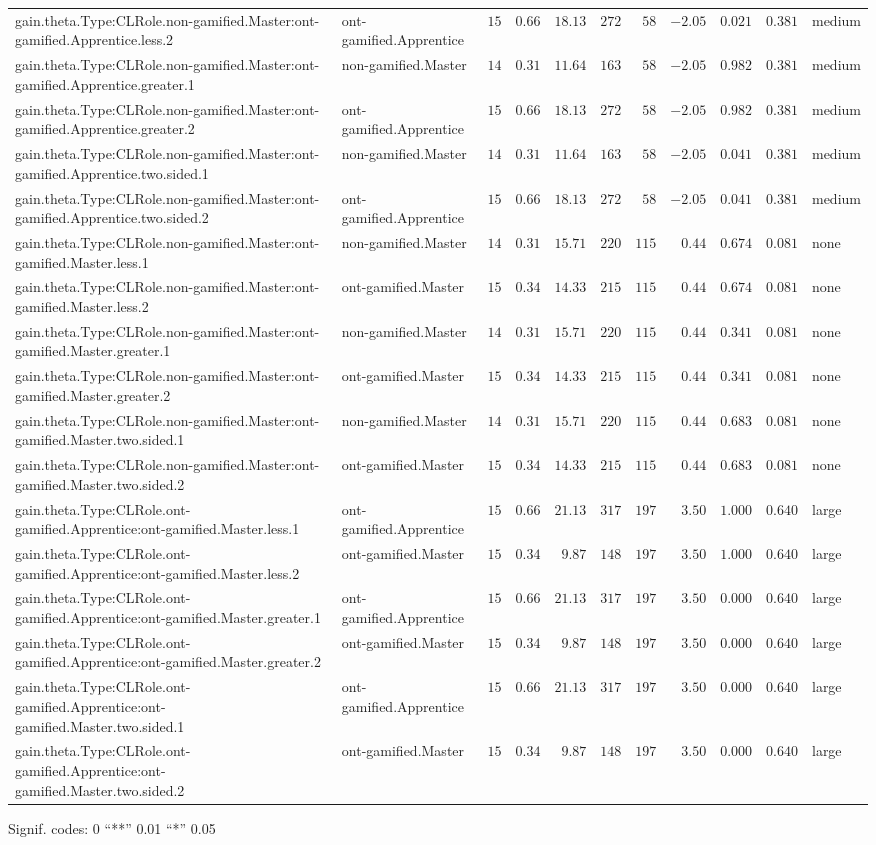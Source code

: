 \documentclass[6pt]{article}
\begin{document}
\begin{landscape}
{\begin{longtable}{llrrrrrrrrl}
gain.theta.Type:CLRole.non-gamified.Master:ont-gamified.Apprentice.less.2&ont-gamified.Apprentice&$15$&$0.66$&$18.13$&$272$&$ 58$&$-2.05$&$0.021$&$0.381$&medium\tabularnewline
gain.theta.Type:CLRole.non-gamified.Master:ont-gamified.Apprentice.greater.1&non-gamified.Master&$14$&$0.31$&$11.64$&$163$&$ 58$&$-2.05$&$0.982$&$0.381$&medium\tabularnewline
gain.theta.Type:CLRole.non-gamified.Master:ont-gamified.Apprentice.greater.2&ont-gamified.Apprentice&$15$&$0.66$&$18.13$&$272$&$ 58$&$-2.05$&$0.982$&$0.381$&medium\tabularnewline
gain.theta.Type:CLRole.non-gamified.Master:ont-gamified.Apprentice.two.sided.1&non-gamified.Master&$14$&$0.31$&$11.64$&$163$&$ 58$&$-2.05$&$0.041$&$0.381$&medium\tabularnewline
gain.theta.Type:CLRole.non-gamified.Master:ont-gamified.Apprentice.two.sided.2&ont-gamified.Apprentice&$15$&$0.66$&$18.13$&$272$&$ 58$&$-2.05$&$0.041$&$0.381$&medium\tabularnewline
gain.theta.Type:CLRole.non-gamified.Master:ont-gamified.Master.less.1&non-gamified.Master&$14$&$0.31$&$15.71$&$220$&$115$&$ 0.44$&$0.674$&$0.081$&none\tabularnewline
gain.theta.Type:CLRole.non-gamified.Master:ont-gamified.Master.less.2&ont-gamified.Master&$15$&$0.34$&$14.33$&$215$&$115$&$ 0.44$&$0.674$&$0.081$&none\tabularnewline
gain.theta.Type:CLRole.non-gamified.Master:ont-gamified.Master.greater.1&non-gamified.Master&$14$&$0.31$&$15.71$&$220$&$115$&$ 0.44$&$0.341$&$0.081$&none\tabularnewline
gain.theta.Type:CLRole.non-gamified.Master:ont-gamified.Master.greater.2&ont-gamified.Master&$15$&$0.34$&$14.33$&$215$&$115$&$ 0.44$&$0.341$&$0.081$&none\tabularnewline
gain.theta.Type:CLRole.non-gamified.Master:ont-gamified.Master.two.sided.1&non-gamified.Master&$14$&$0.31$&$15.71$&$220$&$115$&$ 0.44$&$0.683$&$0.081$&none\tabularnewline
gain.theta.Type:CLRole.non-gamified.Master:ont-gamified.Master.two.sided.2&ont-gamified.Master&$15$&$0.34$&$14.33$&$215$&$115$&$ 0.44$&$0.683$&$0.081$&none\tabularnewline
gain.theta.Type:CLRole.ont-gamified.Apprentice:ont-gamified.Master.less.1&ont-gamified.Apprentice&$15$&$0.66$&$21.13$&$317$&$197$&$ 3.50$&$1.000$&$0.640$&large\tabularnewline
gain.theta.Type:CLRole.ont-gamified.Apprentice:ont-gamified.Master.less.2&ont-gamified.Master&$15$&$0.34$&$ 9.87$&$148$&$197$&$ 3.50$&$1.000$&$0.640$&large\tabularnewline
gain.theta.Type:CLRole.ont-gamified.Apprentice:ont-gamified.Master.greater.1&ont-gamified.Apprentice&$15$&$0.66$&$21.13$&$317$&$197$&$ 3.50$&$0.000$&$0.640$&large\tabularnewline
gain.theta.Type:CLRole.ont-gamified.Apprentice:ont-gamified.Master.greater.2&ont-gamified.Master&$15$&$0.34$&$ 9.87$&$148$&$197$&$ 3.50$&$0.000$&$0.640$&large\tabularnewline
\newpage
gain.theta.Type:CLRole.ont-gamified.Apprentice:ont-gamified.Master.two.sided.1&ont-gamified.Apprentice&$15$&$0.66$&$21.13$&$317$&$197$&$ 3.50$&$0.000$&$0.640$&large\tabularnewline
gain.theta.Type:CLRole.ont-gamified.Apprentice:ont-gamified.Master.two.sided.2&ont-gamified.Master&$15$&$0.34$&$ 9.87$&$148$&$197$&$ 3.50$&$0.000$&$0.640$&large\tabularnewline
\hline
\end{longtable}}\end{landscape}
\begin{flushright}{ \tiny{ Signif. codes:  0 ``**'' 0.01 ``*'' 0.05 }}\end{flushright} 
\end{document}
